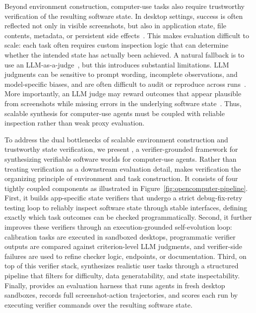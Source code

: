 Beyond environment construction, computer-use tasks also require trustworthy verification of the resulting software state. In desktop settings, success is often reflected not only in visible screenshots, but also in application state, file contents, metadata, or persistent side effects~\cite{xie2024osworld,bonatti2024windows}. This makes evaluation difficult to scale: each task often requires custom inspection logic that can determine whether the intended state has actually been achieved. A natural fallback is to use an LLM-as-a-judge~\cite{liu2023g,kim2024prometheus}, but this introduces substantial limitations. LLM judgments can be sensitive to prompt wording, incomplete observations, and model-specific biases, and are often difficult to audit or reproduce across runs~\citep{wang2024large,li2025generation,thakur2025judging,zheng2023judging}. More importantly, an LLM judge may reward outcomes that appear plausible from screenshots while missing errors in the underlying software state~\citep{sumyk2026cuaaudit,cui2026agentic}. Thus, scalable synthesis for computer-use agents must be coupled with reliable inspection rather than weak proxy evaluation.

To address the dual bottlenecks of scalable environment construction and trustworthy state verification, we present \textbf{\ours}, a verifier-grounded framework for synthesizing verifiable software worlds for computer-use agents. Rather than treating verification as a downstream evaluation detail, \ours makes verification the organizing principle of environment and task construction.
It consists of four tightly coupled components as illustrated in Figure~\ref{fig:opencomputer-pipeline}. First, it builds app-specific state verifiers that undergo a strict debug-fix-retry testing loop to reliably inspect software state through stable interfaces, defining exactly which task outcomes can be checked programmatically. Second, it further improves these verifiers through an execution-grounded self-evolution loop: calibration tasks are executed in sandboxed desktops, programmatic verifier outputs are compared against criterion-level LLM judgments, and verifier-side failures are used to refine checker logic, endpoints, or documentation. Third, on top of this verifier stack, \ours synthesizes realistic user tasks through a structured pipeline that filters for difficulty, data generatability, and state inspectability. Finally, \ours provides an evaluation harness that runs agents in fresh desktop sandboxes, records full screenshot-action trajectories, and scores each run by executing verifier commands over the resulting software state.


